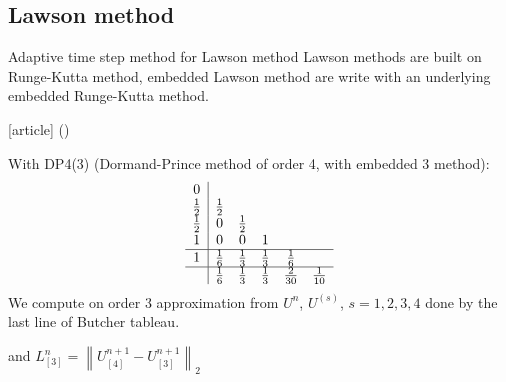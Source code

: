 \documentclass{beamer}
\newcommand{\customcite}[1]{\citeauthor{#1} (\citeyear{#1})}
\begin{document}
\subsection{Lawson method}
\begin{frame}{Adaptive time step method for Lawson method}
  Lawson methods are built on Runge-Kutta method, embedded Lawson method are write with an underlying embedded Runge-Kutta method.

  \begin{thebibliography}{9}
    [article]
     \customcite{Dormand:1978}
  \end{thebibliography}
  With DP4(3) (Dormand-Prince method of order 4, with embedded 3 method):
  $$
    \begin{array}{c|ccccc}
      0           & \\
      \frac{1}{2} & \frac{1}{2} \\
      \frac{1}{2} & 0           & \frac{1}{2} \\
      1           & 0           & 0           & 1           \\
    \hline
      1           & \frac{1}{6} & \frac{1}{3} & \frac{1}{3} & \frac{1}{6} \\
    \hline
                  & \frac{1}{6} & \frac{1}{3} & \frac{1}{3} & \frac{2}{30} & \frac{1}{10}
    \end{array}
  $$
  We compute on order 3 approximation from $U^n$, $U^{(s)}$, $s=1,2,3,4$ done by the last line of Butcher tableau.

  and $L^{n}_{[3]} = \left\| U^{n+1}_{[4]} - U^{n+1}_{[3]} \right\|_2$
\end{frame}
\end{document}
